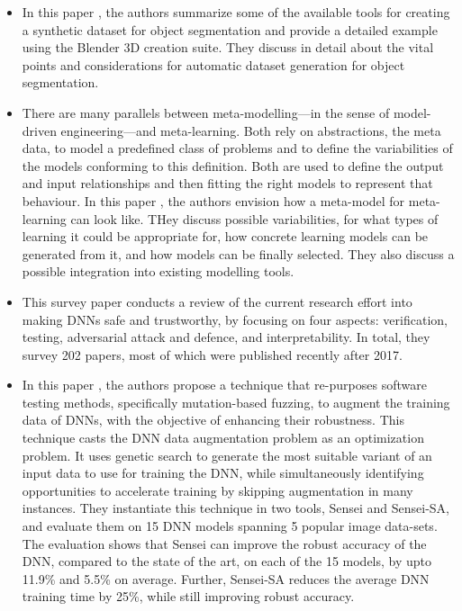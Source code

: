 \documentclass[rnd]{mas_proposal}
\begin{document}
\begin{itemize}
    \item In this paper \cite{9780790}, the authors summarize some of the available tools for creating a synthetic dataset for object segmentation and provide a detailed example using the Blender 3D creation suite. They discuss in detail about the vital points and considerations for automatic dataset generation for object segmentation.
    
    \item There are many parallels between meta-modelling—in the sense of model-driven engineering—and meta-learning. Both rely on abstractions, the meta data, to model a predefined class of problems and to define the variabilities of the models conforming to this definition. Both are used to define the output and input relationships and then fitting the right models to represent that behaviour. In this paper \cite{8906948} , the authors envision how a meta-model for meta-learning can look like. THey discuss possible variabilities, for what types of learning it could be appropriate for, how concrete learning models can be generated from it, and how models can be finally selected. They also discuss a possible integration into existing modelling tools.
    
    \item This survey paper \cite{HUANG2020100270} conducts a review of the current research effort into making DNNs safe and trustworthy, by focusing on four aspects: verification, testing, adversarial attack and defence, and interpretability. In total, they survey 202 papers, most of which were published recently after 2017.
    
    \item In this paper \cite{9283925}, the authors propose a technique that re-purposes software testing methods, specifically mutation-based fuzzing, to augment the training data of DNNs, with the objective of enhancing their robustness. This technique casts the DNN data augmentation problem as an optimization problem. It uses genetic search to generate the most suitable variant of an input data to use for training the DNN, while simultaneously identifying opportunities to accelerate training by skipping augmentation in many instances. They instantiate this technique in two tools, Sensei and Sensei-SA, and evaluate them on 15 DNN models spanning 5 popular image data-sets. The evaluation shows that Sensei can improve the robust accuracy of the DNN, compared to the state of the art, on each of the 15 models, by upto 11.9\% and 5.5\% on average. Further, Sensei-SA reduces the average DNN training time by 25\%, while still improving robust accuracy.
    
\end{itemize}
\end{document}
